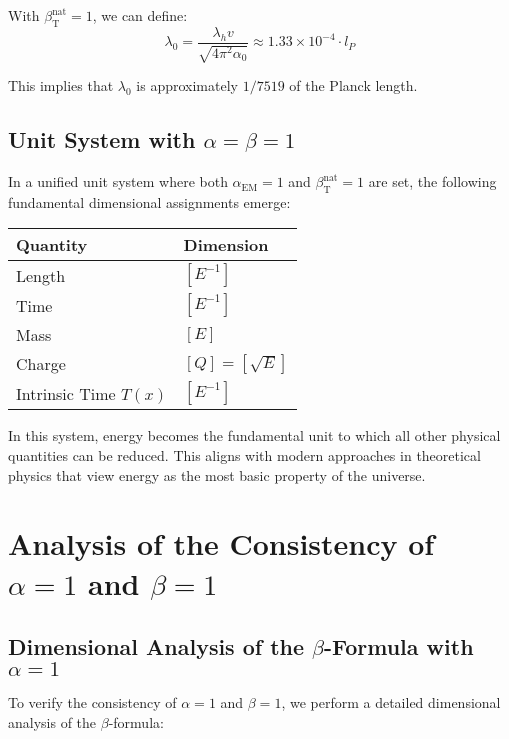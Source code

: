 \documentclass[12pt,a4paper]{article}
\newcommand{\Tfield}{T(x)}
\newcommand{\alphaEM}{\alpha_{\text{EM}}}
\newcommand{\betaT}{\beta_{\text{T}}}
\begin{document}
	With \(\betaT^{\text{nat}} = 1\), we can define:
	\begin{equation}
		\lambda_0 = \frac{\lambda_h v}{\sqrt{4\pi^2 \alpha_0}} \approx 1.33 \times 10^{-4} \cdot l_P
	\end{equation}
	
	This implies that \(\lambda_0\) is approximately \(1/7519\) of the Planck length.
	
	\subsection{Unit System with \(\alpha = \beta = 1\)}
	
	In a unified unit system where both \(\alphaEM = 1\) and \(\betaT^{\text{nat}} = 1\) are set, the following fundamental dimensional assignments emerge:
	
	\begin{tcolorbox}[colback=blue!5!white,colframe=blue!75!black,title=Dimensional Assignments in the Unified Unit System]
		\begin{tabular}{ll}
			\textbf{Quantity} & \textbf{Dimension} \\
			\hline
			Length & \([E^{-1}]\) \\
			Time & \([E^{-1}]\) \\
			Mass & \([E]\) \\
			Charge & \([Q] = [\sqrt{E}]\) \\
			Intrinsic Time \(\Tfield\) & \([E^{-1}]\) \\
		\end{tabular}
	\end{tcolorbox}
	
	In this system, energy becomes the fundamental unit to which all other physical quantities can be reduced. This aligns with modern approaches in theoretical physics that view energy as the most basic property of the universe.
	
	\section{Analysis of the Consistency of \(\alpha = 1\) and \(\beta = 1\)}
	
	\subsection{Dimensional Analysis of the \(\beta\)-Formula with \(\alpha = 1\)}
	
	To verify the consistency of \(\alpha = 1\) and \(\beta = 1\), we perform a detailed dimensional analysis of the \(\beta\)-formula:
	
\end{document}
